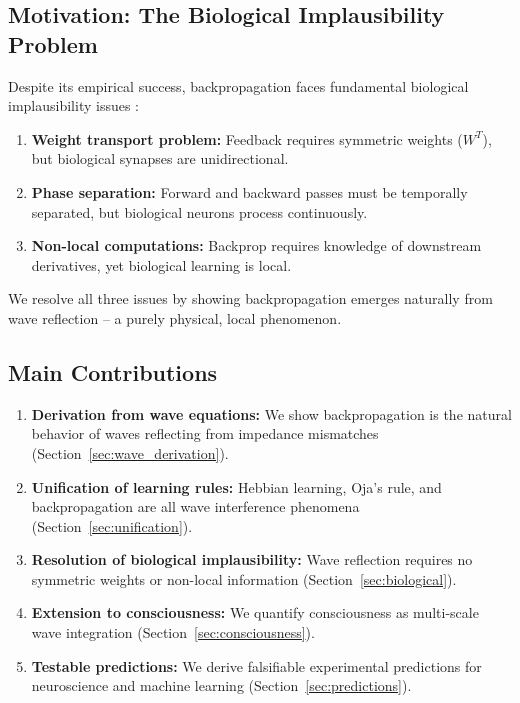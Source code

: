 \documentclass{article}
\begin{document}
\subsection{Motivation: The Biological Implausibility Problem}

Despite its empirical success, backpropagation faces fundamental biological implausibility issues \cite{lillicrap2020backpropagation}:

\begin{enumerate}
\item \textbf{Weight transport problem:} Feedback requires symmetric weights ($W^T$), but biological synapses are unidirectional.
\item \textbf{Phase separation:} Forward and backward passes must be temporally separated, but biological neurons process continuously.
\item \textbf{Non-local computations:} Backprop requires knowledge of downstream derivatives, yet biological learning is local.
\end{enumerate}

We resolve all three issues by showing backpropagation emerges naturally from wave reflection -- a purely physical, local phenomenon.

\subsection{Main Contributions}

\begin{enumerate}
\item \textbf{Derivation from wave equations:} We show backpropagation is the natural behavior of waves reflecting from impedance mismatches (Section~\ref{sec:wave_derivation}).
\item \textbf{Unification of learning rules:} Hebbian learning, Oja's rule, and backpropagation are all wave interference phenomena (Section~\ref{sec:unification}).
\item \textbf{Resolution of biological implausibility:} Wave reflection requires no symmetric weights or non-local information (Section~\ref{sec:biological}).
\item \textbf{Extension to consciousness:} We quantify consciousness as multi-scale wave integration (Section~\ref{sec:consciousness}).
\item \textbf{Testable predictions:} We derive falsifiable experimental predictions for neuroscience and machine learning (Section~\ref{sec:predictions}).
\end{enumerate}
\end{document}
